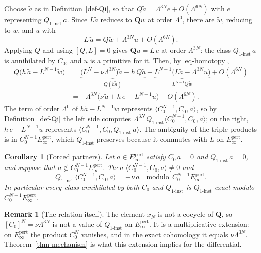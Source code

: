 \documentclass[11pt]{article}
\numberwithin{equation}{section}
\numberwithin{figure}{section}
\numberwithin{table}{section}
\newtheorem{corollary}[theorem]{Corollary}
\theoremstyle{definition}
\newtheorem{remark}[theorem]{Remark}
\newcommand{\Qp}{\mathbf Q}
\newcommand{\Qi}{Q_{1\text{-}\mathrm{inst}}}
\newcommand{\Ep}{E_\infty^{\mathrm{pert}}}
\begin{document}
\begin{proofbox}
Choose $\tilde a$ as in Definition~\ref{def-Qi}, so that $Q\tilde a=\Lambda^{3N}e+O(\Lambda^{6N})$ with $e$ representing $\Qi\,a$. Since $L\tilde a$ reduces to $\Qp w$ at order $\Lambda^0$, there are $\tilde w$, reducing to $w$, and $u$ with
\[
L\,\tilde a=Q\tilde w+\Lambda^{3N}u+O(\Lambda^{6N}).
\]
Applying $Q$ and using $[Q,L]=0$ gives $\Qp u=L\,e$ at order $\Lambda^{3N}$: the class $\Qi\,a$ is annihilated by $C_0$, and $u$ is a primitive for it. Then, by \eqref{eq-homotopy},
\begin{align*}
Q\big(h\,\tilde a-L^{N-1}\tilde w\big)
&=\underbrace{\big(L^N-\nu\Lambda^{3N}\big)\tilde a-h\,Q\tilde a}_{Q(h\tilde a)}-\underbrace{L^{N-1}\big(L\tilde a-\Lambda^{3N}u\big)}_{L^{N-1}Q\tilde w}+O(\Lambda^{6N})\\
&=-\Lambda^{3N}\Big(\nu\,\tilde a+h\,e-L^{N-1}u\Big)+O(\Lambda^{6N}).
\end{align*}
The term of order $\Lambda^0$ of $h\tilde a-L^{N-1}\tilde w$ represents $\langle C_0^{N-1},C_0,a\rangle$, so by Definition~\ref{def-Qi} the left side computes $\Lambda^{3N}\,\Qi\langle C_0^{N-1},C_0,a\rangle$; on the right, $h\,e-L^{N-1}u$ represents $\langle C_0^{N-1},C_0,\Qi\,a\rangle$. The ambiguity of the triple products is in $C_0^{N-1}\Ep$, which $\Qi$ preserves because it commutes with $L$ on $\Ep$.
\end{proofbox}

\begin{corollary}[Forced partners]\label{cor-forced}
Let $a\in\Ep$ satisfy $C_0\,a=0$ and $\Qi\,a=0$, and suppose that $a\notin C_0^{N-1}\Ep$. Then $\langle C_0^{N-1},C_0,a\rangle\neq0$ and
\begin{equation}\label{eq-forced}
\Qi\,\langle C_0^{N-1},C_0,a\rangle=-\nu\,a\quad\text{modulo}\ \ C_0^{N-1}\Ep .
\end{equation}
In particular every class annihilated by both $C_0$ and $\Qi$ is $\Qi$-exact modulo $C_0^{N-1}\Ep$.
\end{corollary}

\begin{remark}[The relation itself]\label{rem-extension}
The element $x_N$ is not a cocycle of $\Qp$, so $[C_0]^N=\nu\Lambda^{3N}$ is not a value of $\Qi$ on $\Ep$. It is a multiplicative extension: on $\Ep$ the product $C_0^N$ vanishes, and in the exact cohomology it equals $\nu\Lambda^{3N}$. Theorem~\ref{thm-mechanism} is what this extension implies for the differential.
\end{remark}
\end{document}
